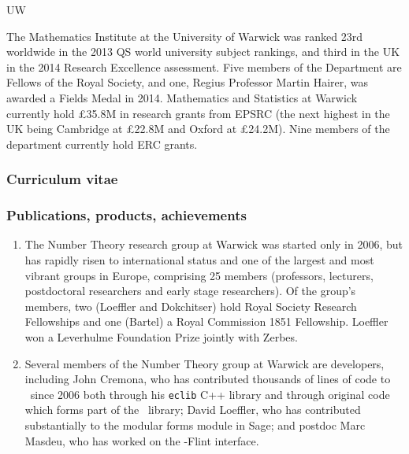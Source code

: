 \begin{sitedescription}{UW}

The Mathematics Institute at the University of Warwick was ranked 23rd
worldwide in the 2013 QS world university subject rankings, and third in
the UK in the 2014 Research Excellence assessment.  Five
members of the Department are Fellows of the Royal Society, and one,
Regius Professor Martin Hairer, was awarded a Fields Medal in 2014.
Mathematics and Statistics at Warwick currently hold £35.8M in
research grants from EPSRC (the next highest in the UK being Cambridge
at £22.8M and Oxford at £24.2M).  Nine members of the department
currently hold ERC grants.



\subsubsection*{Curriculum vitae}




%
%

\subsubsection*{Publications, products, achievements}
\begin{enumerate}
\item
The Number Theory research group at Warwick was started only in 2006,
but has rapidly risen to international status and one of the largest
and most vibrant groups in Europe, comprising 25 members (professors,
lecturers, postdoctoral researchers and early stage researchers).  Of
the group's members, two (Loeffler and Dokchitser) hold Royal Society
Research Fellowships and one (Bartel) a Royal Commission 1851
Fellowship.  Loeffler won a Leverhulme Foundation Prize jointly with
Zerbes.
\item
Several members of the Number Theory group at Warwick are \Sage
developers, including John Cremona, who has contributed thousands of
lines of code to \Sage\ since 2006 both through his {\tt eclib} C++
library and through original \Python code which forms part of the
\Sage\ library; David Loeffler, who has contributed substantially to
the modular forms module in Sage; and postdoc Marc Masdeu, who has
worked on the \Sage-Flint interface.
\end{enumerate}


\end{sitedescription}
